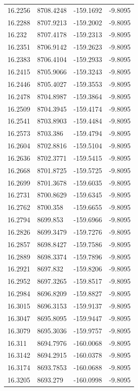 \begin{table}[H]
\begin{tabular}{llll}
16.2256 & 8708.4248 & -159.1692 & -9.8095 \\
16.2288 & 8707.9213 & -159.2002 & -9.8095 \\
16.232 & 8707.4178 & -159.2313 & -9.8095 \\
16.2351 & 8706.9142 & -159.2623 & -9.8095 \\
16.2383 & 8706.4104 & -159.2933 & -9.8095 \\
16.2415 & 8705.9066 & -159.3243 & -9.8095 \\
16.2446 & 8705.4027 & -159.3553 & -9.8095 \\
16.2478 & 8704.8987 & -159.3864 & -9.8095 \\
16.2509 & 8704.3945 & -159.4174 & -9.8095 \\
16.2541 & 8703.8903 & -159.4484 & -9.8095 \\
16.2573 & 8703.386 & -159.4794 & -9.8095 \\
16.2604 & 8702.8816 & -159.5104 & -9.8095 \\
16.2636 & 8702.3771 & -159.5415 & -9.8095 \\
16.2668 & 8701.8725 & -159.5725 & -9.8095 \\
16.2699 & 8701.3678 & -159.6035 & -9.8095 \\
16.2731 & 8700.8629 & -159.6345 & -9.8095 \\
16.2762 & 8700.358 & -159.6655 & -9.8095 \\
16.2794 & 8699.853 & -159.6966 & -9.8095 \\
16.2826 & 8699.3479 & -159.7276 & -9.8095 \\
16.2857 & 8698.8427 & -159.7586 & -9.8095 \\
16.2889 & 8698.3374 & -159.7896 & -9.8095 \\
16.2921 & 8697.832 & -159.8206 & -9.8095 \\
16.2952 & 8697.3265 & -159.8517 & -9.8095 \\
16.2984 & 8696.8209 & -159.8827 & -9.8095 \\
16.3015 & 8696.3153 & -159.9137 & -9.8095 \\
16.3047 & 8695.8095 & -159.9447 & -9.8095 \\
16.3079 & 8695.3036 & -159.9757 & -9.8095 \\
16.311 & 8694.7976 & -160.0068 & -9.8095 \\
16.3142 & 8694.2915 & -160.0378 & -9.8095 \\
16.3174 & 8693.7853 & -160.0688 & -9.8095 \\
16.3205 & 8693.279 & -160.0998 & -9.8095 \\

\end{tabular}
\end{table}
